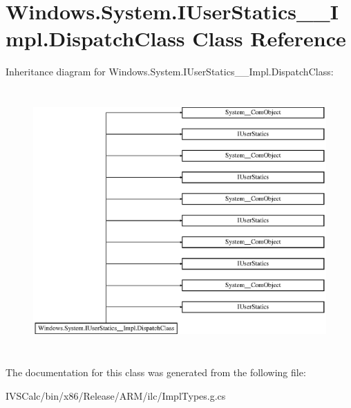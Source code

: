 \hypertarget{class_windows_1_1_system_1_1_i_user_statics_____impl_1_1_dispatch_class}{}\section{Windows.\+System.\+I\+User\+Statics\+\_\+\+\_\+\+Impl.\+Dispatch\+Class Class Reference}
\label{class_windows_1_1_system_1_1_i_user_statics_____impl_1_1_dispatch_class}
Inheritance diagram for Windows.\+System.\+I\+User\+Statics\+\_\+\+\_\+\+Impl.\+Dispatch\+Class\+:\begin{figure}[H]
\begin{center}
\leavevmode
\includegraphics[height=10.131579cm]{class_windows_1_1_system_1_1_i_user_statics_____impl_1_1_dispatch_class}
\end{center}
\end{figure}


The documentation for this class was generated from the following file\+:\begin{DoxyCompactItemize}
\item 
I\+V\+S\+Calc/bin/x86/\+Release/\+A\+R\+M/ilc/Impl\+Types.\+g.\+cs\end{DoxyCompactItemize}
